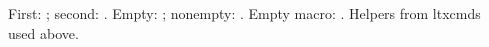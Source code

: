 \documentclass{article}
\begin{document}
First: ; second: .
Empty: ; nonempty: .
Empty macro: \texttt{\meaning\ltx@empty}.
Helpers from ltxcmds used above.
\end{document}
